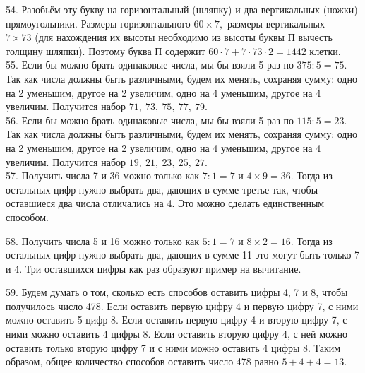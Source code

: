 \documentclass[12pt]{article}
\begin{document}
54. Разобьём эту букву на горизонтальный (шляпку) и два вертикальных (ножки) прямоугольники. Размеры горизонтального $60\times7,$ размеры вертикальных --- $7\times73$ (для нахождения их высоты необходимо из высоты буквы П вычесть толщину шляпки). Поэтому буква П содержит $60\cdot7+7\cdot73\cdot2=1442$ клетки.\\
55. Если бы можно брать одинаковые числа, мы бы взяли 5 раз по $375:5=75.$ Так как числа должны быть различными, будем их менять, сохраняя сумму: одно на 2 уменьшим, другое на 2 увеличим, одно на 4 уменьшим, другое на 4 увеличим. Получится набор $71,\ 73,\ 75,\ 77,\ 79.$\\
56. Если бы можно брать одинаковые числа, мы бы взяли 5 раз по $115:5=23.$ Так как числа должны быть различными, будем их менять, сохраняя сумму: одно на 2 уменьшим, другое на 2 увеличим, одно на 4 уменьшим, другое на 4 увеличим. Получится набор $19,\ 21,\ 23,\ 25,\ 27.$\\
57. Получить числа 7 и 36 можно только как $7:1=7$ и $4\times9=36.$ Тогда из остальных цифр нужно выбрать два, дающих в сумме третье так, чтобы оставшиеся два числа отличались на 4. Это можно сделать единственным способом.
\begin{center}
\begin{figure}[ht!]
\end{figure}
\end{center}
58. Получить числа 5 и 16 можно только как $5:1=7$ и $8\times2=16.$ Тогда из остальных цифр нужно выбрать два, дающих в сумме 11 это могут быть только 7 и 4. Три оставшихся цифры как раз образуют пример на вычитание.
\begin{center}
\begin{figure}[ht!]
\end{figure}
\end{center}
59. Будем думать о том, сколько есть способов оставить цифры 4, 7 и 8, чтобы получилось число 478. Если оставить первую цифру 4 и первую цифру 7, с ними можно оставить 5 цифр 8. Если оставить первую цифру 4 и вторую цифру 7, с ними можно оставить 4 цифры 8. Если оставить вторую цифру 4, с ней можно оставить только вторую цифру 7 и с ними можно оставить 4 цифры 8. Таким образом, общее количество способов оставить число 478 равно $5+4+4=13.$\\
\end{document}
